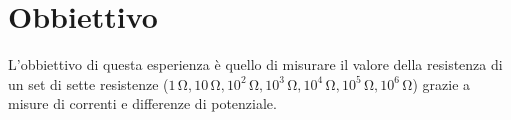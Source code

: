 \section*{Obbiettivo}

L'obbiettivo di questa esperienza è quello di misurare il valore della resistenza di un set di sette resistenze ($1\,\si{\ohm}, 10\,\si{\ohm}, 10^2\,\si{\ohm}, 10^3\,\si{\ohm}, 10^4\,\si{\ohm}, 10^5\,\si{\ohm}, 10^6\,\si{\ohm}$) grazie a misure di correnti e differenze di potenziale.


